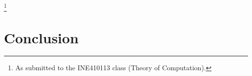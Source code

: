 \documentclass[12pt]{article}
\begin{document}
\footnote{As submitted to the INE410113 class (Theory of Computation).}


\section{Conclusion}\label{sec:conc}




\end{document}
